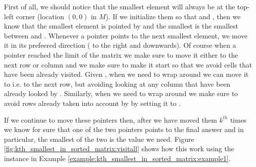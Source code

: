 First of all, we should notice that the smallest element will always be at the top-left corner (location $(0,0)$ in $M$).
If we initialize them so that  and , then we know that the  smallest element is pointed by  and the  smallest is the smallest between   and . Whenever a pointer points to the next smallest element, we move it in its prefeered direction ( to the right and  downwards). Of course when a pointer reached the limit of the matrix we make sure to move it either to the next row or column and we make sure to make it start so that we avoid cells that have been already visited. Given , when we need to wrap around  we can move it to  i.e. to the next row, but avoiding looking at any column that have been already looked by . Similarly, when we need to wrap around  we make sure to avoid rows already taken into account by  by setting it to . 

If we continue to move these pointers then, after we have moved them $k^{th}$ times we know for sure that one of the two pointers points to the final answer and in particular, the smallest of the two is the value we need.
Figure \ref{fig:kth_smallest_in_sorted_matrix:visitall} shows how this work using the instance in Example \ref{example:kth_smallest_in_sorted_matrix:example1}.

